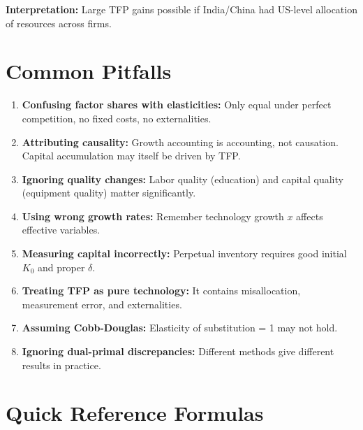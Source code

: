 \documentclass[a4paper,11pt]{article}
\begin{document}
\begin{resultbox}
\textbf{Interpretation:} Large TFP gains possible if India/China had US-level allocation of resources across firms.
\end{resultbox}

\section{Common Pitfalls}

\begin{enumerate}
    \item \textbf{Confusing factor shares with elasticities:} Only equal under perfect competition, no fixed costs, no externalities.
    
    \item \textbf{Attributing causality:} Growth accounting is accounting, not causation. Capital accumulation may itself be driven by TFP.
    
    \item \textbf{Ignoring quality changes:} Labor quality (education) and capital quality (equipment quality) matter significantly.
    
    \item \textbf{Using wrong growth rates:} Remember technology growth $x$ affects effective variables.
    
    \item \textbf{Measuring capital incorrectly:} Perpetual inventory requires good initial $K_0$ and proper $\delta$.
    
    \item \textbf{Treating TFP as pure technology:} It contains misallocation, measurement error, and externalities.
    
    \item \textbf{Assuming Cobb-Douglas:} Elasticity of substitution = 1 may not hold.
    
    \item \textbf{Ignoring dual-primal discrepancies:} Different methods give different results in practice.
\end{enumerate}

\section{Quick Reference Formulas}
\end{document}
